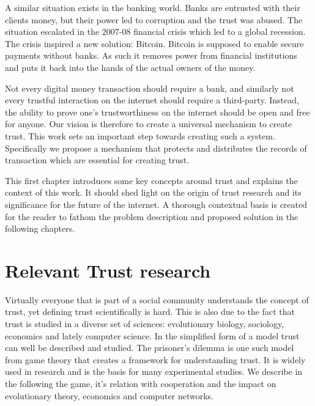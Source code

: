 A similar situation exists in the banking world. Banks are entrusted with their clients money, but 
their power led to corruption and the trust was abused. The situation escalated in the 2007-08 
financial crisis which led to a global recession. The crisis inspired a new solution: Bitcoin. Bitcoin
is supposed to enable secure payments without banks. As such it removes power from financial 
institutions and puts it back into the hands of the actual owners of the money. 

Not every digital money transaction should require a bank, and similarly not every trustful
interaction on the internet should require a third-party. Instead, the ability to prove one's trustworthiness
on the internet should be open and free for anyone. Our vision is therefore to create a universal
mechanism to create trust. This work sets an important 
step towards creating such a system. Specifically we propose a mechanism that protects and 
distributes the records of transaction which are essential for creating trust. 

This first chapter introduces some key concepts around trust and explains the context of this work.
It should shed light on the origin of trust research and its significance for the future of the 
internet. A thorough contextual basis is created for the reader to fathom the problem description
and proposed solution in the following chapters.

\section{Relevant Trust research}
Virtually everyone that is part of a social community understands the concept of trust, yet defining
trust scientifically is hard. This is also due to the fact that trust is studied in a diverse set 
of sciences: evolutionary biology, sociology, economics and lately computer science. In the simplified
form of a model trust can well be described and studied. The prisoner's 
dilemma\cite{chammah1965prisoner} is one such model from game theory that creates a framework for 
understanding trust. It is widely used in research and is the basis for many experimental studies.
We describe in the following the game, it's relation with cooperation and the impact on evolutionary
theory, economics and computer networks.

